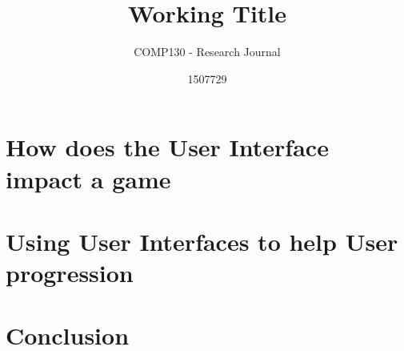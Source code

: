 \documentclass{scrartcl}
\title{Working Title}
\subtitle{COMP130 - Research Journal}
\author{1507729}
\begin{document}
\maketitle

\abstract{}

\section{How does the User Interface impact a game}

\cite{hauge2014implications}

\section{Using User Interfaces to help User progression}

\section{}

\section{Conclusion}





\end{document}
